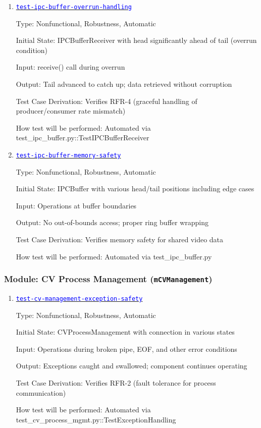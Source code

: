 \documentclass[12pt, titlepage]{article}
\newcommand{\mref}[1]{\texttt{#1}}
\newcommand{\tid}[1]{\hyperlink{tid:#1}{\textcolor{blue}{\texttt{#1}}}}
\begin{document}
\begin{enumerate}

  \item{\tid{test-ipc-buffer-overrun-handling}\\}

        Type: Nonfunctional, Robustness, Automatic

        Initial State: IPCBufferReceiver with head significantly ahead of tail (overrun
        condition)

        Input: receive() call during overrun

        Output: Tail advanced to catch up; data retrieved without corruption

        Test Case Derivation: Verifies RFR-4 (graceful handling of producer/consumer
        rate mismatch)

        How test will be performed: Automated via
        test\_ipc\_buffer.py::TestIPCBufferReceiver

  \item{\tid{test-ipc-buffer-memory-safety}\\}

        Type: Nonfunctional, Robustness, Automatic

        Initial State: IPCBuffer with various head/tail positions including edge cases

        Input: Operations at buffer boundaries

        Output: No out-of-bounds access; proper ring buffer wrapping

        Test Case Derivation: Verifies memory safety for shared video data

        How test will be performed: Automated via test\_ipc\_buffer.py

\end{enumerate}

\subsubsection{Module: CV Process Management (\mref{mCVManagement})}

\begin{enumerate}

  \item{\tid{test-cv-management-exception-safety}\\}

        Type: Nonfunctional, Robustness, Automatic

        Initial State: CVProcessManagement with connection in various states

        Input: Operations during broken pipe, EOF, and other error conditions

        Output: Exceptions caught and swallowed; component continues operating

        Test Case Derivation: Verifies RFR-2 (fault tolerance for process
        communication)

        How test will be performed: Automated via
        test\_cv\_process\_mgmt.py::TestExceptionHandling

\end{enumerate}
\end{document}
